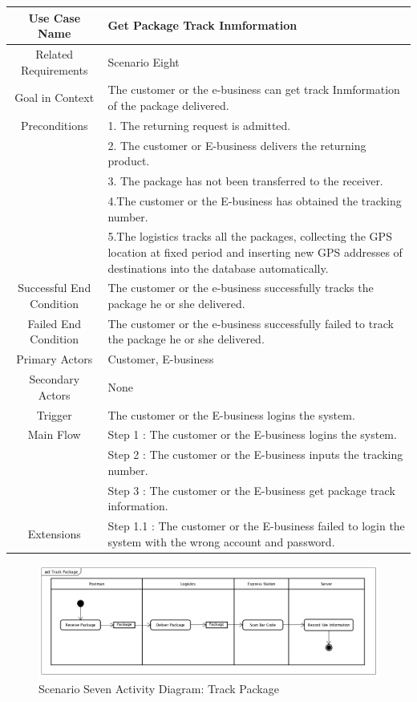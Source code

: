 \documentclass[12pt]{scrreprt}
\begin{document}
\begin{table}
  \centering
  \begin{tabular}{| c | p{11cm} |}
    \hline
    Use Case Name & Get Package Track Inmformation\\
    \hline
    Related Requirements & Scenario Eight\\
    \hline
    Goal in Context & The customer or the e-business can get track Inmformation
    of the package delivered.\\
    \hline
    Preconditions & 1. The returning request is admitted.\\
    & 2. The customer or E-business delivers the returning product.\\
    & 3. The package has not been transferred to the receiver.\\
    & 4.The customer or the E-business has obtained the tracking number.\\
    & 5.The logistics tracks all the packages, collecting the GPS location at
    fixed period and inserting new GPS addresses of destinations into the
    database automatically.\\
    \hline
    Successful End Condition & The customer or the e-business successfully
    tracks the package he or she delivered.\\
    \hline
    Failed End Condition & The customer or the e-business successfully failed
    to track the package he or she delivered.\\
    \hline
    Primary Actors & Customer, E-business\\
    \hline
    Secondary Actors & None\\
    \hline
    Trigger & The customer or the E-business logins the system.\\
    \hline
    Main Flow & Step 1 : The customer or the E-business logins the system.\\
    & Step 2 : The customer or the E-business inputs the tracking number.\\
    & Step 3 : The customer or the E-business get package track information.\\
    \hline
    Extensions & Step 1.1 : The customer or the E-business failed to login the
    system with the wrong account and password.\\
    \hline
  \end{tabular}
\end{table}

\begin{figure}[H]
  \centering\includegraphics[width=6in]{DocumentRes/8TrackPackage.png}
  \caption{Scenario Seven Activity Diagram: Track Package}
\end{figure}
\end{document}
